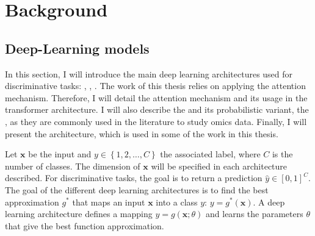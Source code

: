 \documentclass[../main.tex]{subfiles}
\begin{document}
\chapter{Background}\label{chap:background}
\minitocpagecentered

\section{Deep-Learning models}
	In this section, I will introduce the main deep learning architectures used for discriminative tasks: , , .
	The work of this thesis relies on applying the attention mechanism.
	Therefore, I will detail the attention mechanism and its usage in the transformer architecture.
	I will also describe the  and its probabilistic variant, the , as they are commonly used in the literature to study omics data.
	Finally, I will present the  architecture, which is used in some of the work in this thesis.

	Let \(\symbf{x}\) be the input and \(y \in \left\{1,2, \ldots, C \right\} \) the associated label, where \(C\) is the number of classes.
	The dimension of \(\symbf{x}\) will be specified in each architecture described.
	For discriminative tasks, the goal is to return a prediction \(\hat{y} \in {\left[0,1\right]}^C\).
	The goal of the different deep learning architectures is to find the best approximation \(g^{*}\) that maps an input \(\symbf{x}\) into a class \(y\): \(y = g^{*}\left(\symbf{x}\right)\).
	A deep learning architecture defines a mapping \(y=g\left(\symbf{x}; \theta\right)\) and learns the parameters \(\theta\) that give the best function approximation.
\end{document}
